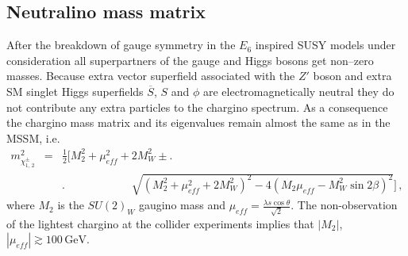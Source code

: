 \documentclass[12pt,a4paper]{article}
\newcommand{\be}{\begin{equation}}
\newcommand{\ee}{\end{equation}}
\newcommand{\ba}{\begin{array}}
\newcommand{\ea}{\end{array}}
\newcommand{\ds}{\displaystyle}
\begin{document}
\newpage
\begin{appendix}
\section{Neutralino mass matrix}
\setcounter{equation}{0}
\def\theequation{A.\arabic{equation}}

After the breakdown of gauge symmetry in the $E_6$ inspired SUSY models under consideration
all superpartners of the gauge and Higgs bosons get non--zero masses. Because extra vector
superfield associated with the $Z'$ boson and extra SM singlet Higgs superfields
$\overline{S}$, $S$ and $\phi$ are electromagnetically neutral they do not contribute any
extra particles to the chargino spectrum. As a consequence the chargino mass matrix and
its eigenvalues remain almost the same as in the MSSM, i.e.
\be
\ba{rcl}
m^2_{\chi^{\pm}_{1,\,2}}&=&\ds\frac{1}{2}\biggl[M_2^2+\mu_{eff}^2+2 M^2_{W}\pm\biggl.\\[2mm]
&&\biggr.\qquad\qquad\qquad\sqrt{(M_2^2+\mu^2_{eff}+2M^2_{W})^2-4(M_2\mu_{eff}-M^2_{W}\sin 2\beta)^2}
\biggr]\,,
\ea
\label{a1}
\ee
where $M_2$ is the $SU(2)_W$ gaugino mass and $\mu_{eff}=\ds\frac{\lambda s \cos\theta}{\sqrt{2}}$.
The non-observation of the lightest chargino at the collider experiments implies that
$|M_2|$, $|\mu_{eff}|\gtrsim 100\,\mbox{GeV}$.


\end{appendix}
\end{document}
